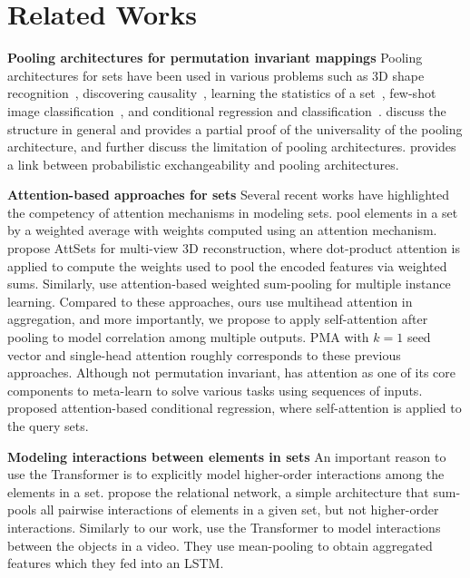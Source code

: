 \section{Related Works}
\label{sec:related_works}
\textbf{Pooling architectures for permutation invariant mappings} \hspace{1pt}
Pooling architectures for sets have been used in various problems such as 3D shape recognition~\citep{BaoguangShi2015, Su2015},
discovering causality~\citep{Lopez-Paz2016},
learning the statistics of a set~\citep{Edwards2017},
few-shot image classification~\citep{Snell2017},
and conditional regression and classification~\citep{Garnelo2018}.
\citet{Zaheer2017} discuss the structure in general and provides a partial proof of the universality of the pooling architecture,
and \citet{Wagstaff2019} further discuss the limitation of pooling architectures. \citet{Bloem-Reddy2019} provides a link between
probabilistic exchangeability and pooling architectures.

\textbf{Attention-based approaches for sets} \hspace{1pt}
Several recent works have highlighted the competency of attention mechanisms in modeling sets.
\citet{Vinyals2016a} pool elements in a set by a weighted average with weights computed using an attention mechanism.
\citet{Yang2018} propose AttSets for multi-view 3D reconstruction, where dot-product attention is applied to compute the weights used to pool the encoded features via weighted sums.
Similarly, \citet{Ilse2018} use attention-based weighted sum-pooling for multiple instance learning.
Compared to these approaches, ours use multihead attention in aggregation, and more importantly, we propose to apply self-attention after pooling to model correlation among multiple outputs.
PMA with $k=1$ seed vector and single-head attention roughly corresponds to these previous approaches.
Although not permutation invariant, \citet{Mishra2018} has attention as one of its core components to meta-learn to solve various tasks using sequences of inputs.
\citet{Kim2019} proposed attention-based conditional regression, where self-attention is applied to the query sets.

\textbf{Modeling interactions between elements in sets} \hspace{1pt}
An important reason to use the Transformer is to explicitly model higher-order interactions among the elements in a set.
\citet{Santoro2017} propose the relational network, a simple architecture that sum-pools all pairwise interactions of elements in a given set, but not higher-order interactions.
Similarly to our work, \citet{Ma2018} use the Transformer to model interactions between the objects in a video.
They use mean-pooling to obtain aggregated features which they fed into an LSTM.

